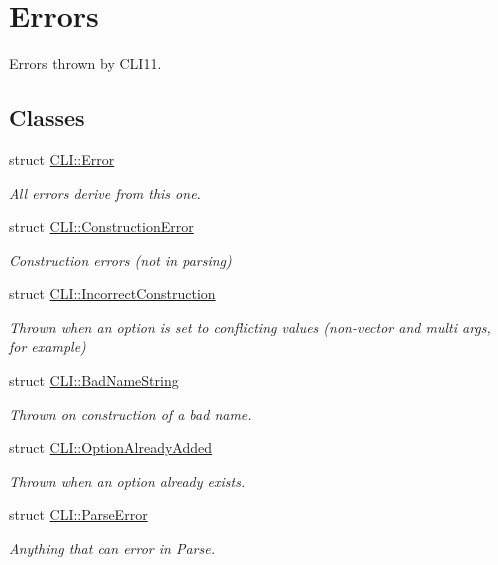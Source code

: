 \hypertarget{group__error__group}{}\section{Errors}
\label{group__error__group}


Errors thrown by C\+L\+I11.  


\subsection*{Classes}
\begin{DoxyCompactItemize}
\item 
struct \hyperlink{struct_c_l_i_1_1_error}{C\+L\+I\+::\+Error}
\begin{DoxyCompactList}\small\item\em All errors derive from this one. \end{DoxyCompactList}\item 
struct \hyperlink{struct_c_l_i_1_1_construction_error}{C\+L\+I\+::\+Construction\+Error}
\begin{DoxyCompactList}\small\item\em Construction errors (not in parsing) \end{DoxyCompactList}\item 
struct \hyperlink{struct_c_l_i_1_1_incorrect_construction}{C\+L\+I\+::\+Incorrect\+Construction}
\begin{DoxyCompactList}\small\item\em Thrown when an option is set to conflicting values (non-\/vector and multi args, for example) \end{DoxyCompactList}\item 
struct \hyperlink{struct_c_l_i_1_1_bad_name_string}{C\+L\+I\+::\+Bad\+Name\+String}
\begin{DoxyCompactList}\small\item\em Thrown on construction of a bad name. \end{DoxyCompactList}\item 
struct \hyperlink{struct_c_l_i_1_1_option_already_added}{C\+L\+I\+::\+Option\+Already\+Added}
\begin{DoxyCompactList}\small\item\em Thrown when an option already exists. \end{DoxyCompactList}\item 
struct \hyperlink{struct_c_l_i_1_1_parse_error}{C\+L\+I\+::\+Parse\+Error}
\begin{DoxyCompactList}\small\item\em Anything that can error in Parse. \end{DoxyCompactList}\item 

\end{DoxyCompactItemize}
